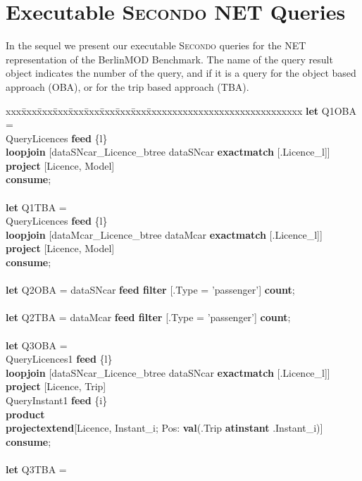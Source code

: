 \documentclass[a4paper]{article}
\newcommand{\secondo}{\textsc{Secondo}}
\newcommand{\bmodb} {BerlinMOD Benchmark}
\newcommand{\op}[1]{\textbf{#1}}
\begin{document}
\section{Executable \secondo{} NET Queries}
\label{app:executableQueries}
In the sequel we present our executable \secondo{} queries for the NET representation
of the \bmodb{}. The name of the query result object indicates the number of
the query, and if it is a query for the object based approach (OBA), or for the
trip based approach (TBA).
\begin{scriptsize}
\begin{tabbing}
xxx\=xxx\=xxx\=xxx\=xxx\=xxx\=xxx\=xxx\=xxx\=xxxxxxxxxxxxxxxxxxxxxxxxxxxxxx\kill
\op{let} Q1OBA =\\
\>QueryLicences \op{feed} \{l\}\\
\>\op{loopjoin} [dataSNcar\_Licence\_btree dataSNcar \op{exactmatch} [.Licence\_l]]\\
\>\op{project} [Licence, Model]\\
\op{consume};\\
\\
\op{let} Q1TBA =\\
\>QueryLicences \op{feed} \{l\}\\
\>\op{loopjoin} [dataMcar\_Licence\_btree dataMcar \op{exactmatch} [.Licence\_l]]\\
\>\op{project} [Licence, Model]\\
\op{consume};\\
\\
\op{let} Q2OBA = dataSNcar \op{feed filter} [.Type = 'passenger'] \op{count};\\
\\
\op{let} Q2TBA = dataMcar \op{feed filter} [.Type = 'passenger'] \op{count};\\
\\
\op{let} Q3OBA =\\
\>QueryLicences1 \op{feed} \{l\}\\
\>\>\op{loopjoin} [dataSNcar\_Licence\_btree dataSNcar \op{exactmatch} [.Licence\_l]]\\
\>\>\op{project} [Licence, Trip]\\
\>QueryInstant1 \op{feed} \{i\}\\
\>\op{product}\\
\>\op{projectextend}[Licence, Instant\_i; Pos: \op{val}(.Trip \op{atinstant} .Instant\_i)]\\
\op{consume};\\
\\
\op{let} Q3TBA =\\

\end{tabbing}
\end{scriptsize}
\end{document}
